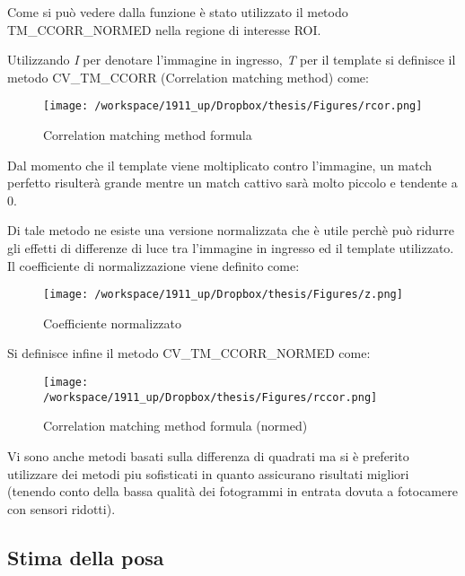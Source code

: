 Come si può vedere dalla funzione è stato utilizzato il metodo TM\_CCORR\_NORMED nella regione di interesse ROI. 

Utilizzando \textit{I} per denotare l'immagine in ingresso, \textit{T} per il template si definisce il metodo CV\_TM\_CCORR (Correlation matching method) come: 

\begin{figure}[H]\centering  
\texttt{[image: /workspace/1911\_up/Dropbox/thesis/Figures/rcor.png]}
\caption[Correlation matching method formula]{Correlation matching method formula}
\label{pic-a}
\end{figure}

Dal momento che il template viene moltiplicato contro l'immagine, un match perfetto risulterà grande mentre un match cattivo sarà molto piccolo e tendente a 0.

Di tale metodo ne esiste una versione normalizzata che è utile perchè può ridurre gli effetti di differenze di luce tra l'immagine in ingresso ed il template utilizzato. Il coefficiente di normalizzazione viene definito come:

\begin{figure}[H]\centering  
\texttt{[image: /workspace/1911\_up/Dropbox/thesis/Figures/z.png]}
\caption[Coefficiente normalizzato]{Coefficiente normalizzato}
\label{pic-a}
\end{figure}

Si definisce infine il metodo CV\_TM\_CCORR\_NORMED come:

\begin{figure}[H]\centering  
\texttt{[image: /workspace/1911\_up/Dropbox/thesis/Figures/rccor.png]}
\caption[Correlation matching method formula (normed)]{Correlation matching method formula (normed)}
\label{pic-a}
\end{figure}

Vi sono anche metodi basati sulla differenza di quadrati ma si è preferito utilizzare dei metodi piu sofisticati in quanto assicurano risultati migliori (tenendo conto della bassa qualità dei fotogrammi in entrata dovuta a fotocamere con sensori ridotti).





\newpage
\subsection{Stima della posa}

